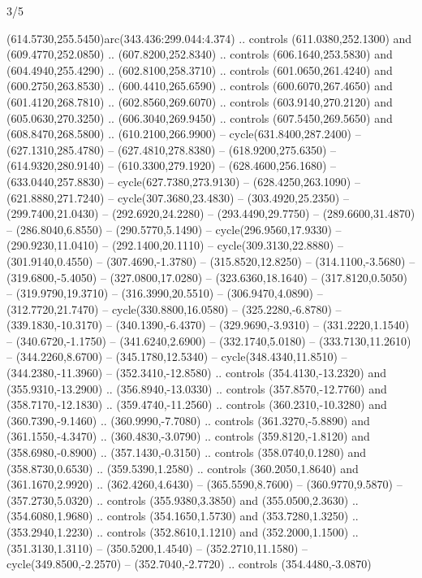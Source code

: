 \begin{flagdescription}{3/5}
\begin{scope} [xshift=0.5\flagwidth*\stretchfactor,yshift=0.5\flagwidth,scale=\flagwidth/391]
\begin{scope}[y=0.8pt, x=0.8pt, yscale=-1, xscale=1,line width=0.01\lw,shift={(-98.875,-338.125)}]
\begin{scope}[cm={{0.15382,0.0,0.0,0.15382,(34.72393,273.11413)}}]
  (614.5730,255.5450)arc(343.436:299.044:4.374) .. controls (611.0380,252.1300)
  and (609.4770,252.0850) .. (607.8200,252.8340) .. controls (606.1640,253.5830)
  and (604.4940,255.4290) .. (602.8100,258.3710) .. controls (601.0650,261.4240)
  and (600.2750,263.8530) .. (600.4410,265.6590) .. controls (600.6070,267.4650)
  and (601.4120,268.7810) .. (602.8560,269.6070) .. controls (603.9140,270.2120)
  and (605.0630,270.3250) .. (606.3040,269.9450) .. controls (607.5450,269.5650)
  and (608.8470,268.5800) .. (610.2100,266.9900) -- cycle(631.8400,287.2400) --
  (627.1310,285.4780) -- (627.4810,278.8380) -- (618.9200,275.6350) --
  (614.9320,280.9140) -- (610.3300,279.1920) -- (628.4600,256.1680) --
  (633.0440,257.8830) -- cycle(627.7380,273.9130) -- (628.4250,263.1090) --
  (621.8880,271.7240) -- cycle(307.3680,23.4830) -- (303.4920,25.2350) --
  (299.7400,21.0430) -- (292.6920,24.2280) -- (293.4490,29.7750) --
  (289.6600,31.4870) -- (286.8040,6.8550) -- (290.5770,5.1490) --
  cycle(296.9560,17.9330) -- (290.9230,11.0410) -- (292.1400,20.1110) --
  cycle(309.3130,22.8880) -- (301.9140,0.4550) -- (307.4690,-1.3780) --
  (315.8520,12.8250) -- (314.1100,-3.5680) -- (319.6800,-5.4050) --
  (327.0800,17.0280) -- (323.6360,18.1640) -- (317.8120,0.5050) --
  (319.9790,19.3710) -- (316.3990,20.5510) -- (306.9470,4.0890) --
  (312.7720,21.7470) -- cycle(330.8800,16.0580) -- (325.2280,-6.8780) --
  (339.1830,-10.3170) -- (340.1390,-6.4370) -- (329.9690,-3.9310) --
  (331.2220,1.1540) -- (340.6720,-1.1750) -- (341.6240,2.6900) --
  (332.1740,5.0180) -- (333.7130,11.2610) -- (344.2260,8.6700) --
  (345.1780,12.5340) -- cycle(348.4340,11.8510) -- (344.2380,-11.3960) --
  (352.3410,-12.8580) .. controls (354.4130,-13.2320) and (355.9310,-13.2900) ..
  (356.8940,-13.0330) .. controls (357.8570,-12.7760) and (358.7170,-12.1830) ..
  (359.4740,-11.2560) .. controls (360.2310,-10.3280) and (360.7390,-9.1460) ..
  (360.9990,-7.7080) .. controls (361.3270,-5.8890) and (361.1550,-4.3470) ..
  (360.4830,-3.0790) .. controls (359.8120,-1.8120) and (358.6980,-0.8900) ..
  (357.1430,-0.3150) .. controls (358.0740,0.1280) and (358.8730,0.6530) ..
  (359.5390,1.2580) .. controls (360.2050,1.8640) and (361.1670,2.9920) ..
  (362.4260,4.6430) -- (365.5590,8.7600) -- (360.9770,9.5870) --
  (357.2730,5.0320) .. controls (355.9380,3.3850) and (355.0500,2.3630) ..
  (354.6080,1.9680) .. controls (354.1650,1.5730) and (353.7280,1.3250) ..
  (353.2940,1.2230) .. controls (352.8610,1.1210) and (352.2000,1.1500) ..
  (351.3130,1.3110) -- (350.5200,1.4540) -- (352.2710,11.1580) --
  cycle(349.8500,-2.2570) -- (352.7040,-2.7720) .. controls (354.4480,-3.0870)

\end{scope}
\end{scope}
\end{scope}
\end{flagdescription}
